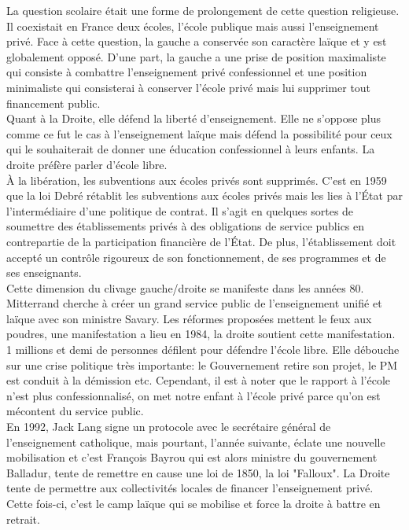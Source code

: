 \documentclass[10pt, a4paper, openany]{book}
\begin{document}
La question scolaire était une forme de prolongement de cette question religieuse. Il coexistait en France deux écoles, l'école publique mais aussi l'enseignement privé. Face à cette question, la gauche a conservée son caractère laïque et y est globalement opposé. D'une part, la gauche a une prise de position maximaliste qui consiste à combattre l'enseignement privé confessionnel et une position minimaliste qui consisterai à conserver l'école privé mais lui supprimer tout financement public. \\
Quant à la Droite, elle défend la liberté d'enseignement. Elle ne s'oppose plus comme ce fut le cas à l'enseignement laïque mais défend la possibilité pour ceux qui le souhaiterait de donner une éducation confessionnel à leurs enfants. La droite préfère parler d'école libre. \\
À la libération, les subventions aux écoles privés sont supprimés. C'est en 1959 que la loi Debré rétablit les subventions aux écoles privés mais les lies à l'État par l'intermédiaire d'une politique de contrat. Il s'agit en quelques sortes de soumettre des établissements privés à des obligations de service publics en contrepartie de la participation financière de l'État. De plus, l'établissement doit accepté un contrôle rigoureux de son fonctionnement, de ses programmes et de ses enseignants. \\
Cette dimension du clivage gauche/droite se manifeste dans les années 80. Mitterrand cherche à créer un grand service public de l'enseignement unifié et laïque avec son ministre Savary. Les réformes proposées mettent le feux aux poudres, une manifestation a lieu en 1984, la droite soutient cette manifestation. 1 millions et demi de personnes défilent pour défendre l'école libre. Elle débouche sur une crise politique très importante: le Gouvernement retire son projet, le PM est conduit à la démission etc. Cependant, il est à noter que le rapport à l'école n'est plus confessionnalisé, on met notre enfant à l'école privé parce qu'on est mécontent du service public. \\
En 1992, Jack Lang signe un protocole avec le secrétaire général de l'enseignement catholique, mais pourtant, l'année suivante, éclate une nouvelle mobilisation et c'est François Bayrou qui est alors ministre du gouvernement Balladur, tente de remettre en cause une loi de 1850, la loi "Falloux". La Droite tente de permettre aux collectivités locales de financer l'enseignement privé. Cette fois-ci, c'est le camp laïque qui se mobilise et force la droite à battre en retrait. 
\end{document}

